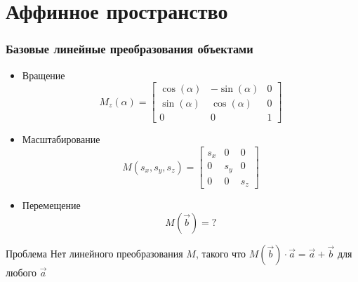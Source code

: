 \documentclass{beamer}
\begin{document}
\section{Аффинное пространство}
\begin{frame}
\frametitle{Базовые линейные преобразования объектами}
\begin{itemize}
    \item Вращение 
        \begin{equation*}
            M_z(\alpha) = \left[\begin{matrix}
                \cos(\alpha)  &-\sin(\alpha) &0 \\
                \sin(\alpha) \ &\cos(\alpha)   &0 \\
                0          &0            &1
            \end{matrix} \right]
        \end{equation*}
    \item Масштабирование
        \begin{equation*}
            M(s_x, s_y, s_z) = \left[\begin{matrix}
                s_x  & 0  &0 \\
                0 &s_y &0 \\
                0  &0 &s_z
            \end{matrix} \right]
        \end{equation*}
    \item Перемещение
        \begin{equation*}
            M(\vec{b}) = ?
        \end{equation*}
\end{itemize}
\begin{block} {Проблема}
Нет линейного преобразования $M$, такого что $M(\vec{b})\cdot \vec{a} = \vec{a} + \vec{b}$ для любого $\vec{a}$
\end{block}

\end{frame}
\end{document}

